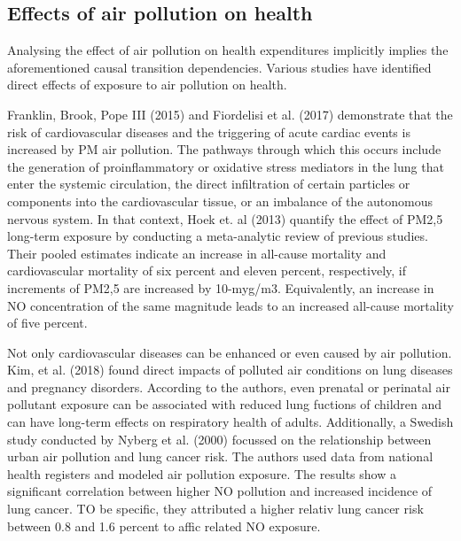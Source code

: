 \documentclass[]{article}
\begin{document}
\subsection{Effects of air pollution on health}

Analysing the effect of air pollution on health expenditures implicitly implies the aforementioned causal transition dependencies. Various studies have identified direct effects of exposure to air pollution on health. %

Franklin, Brook, Pope III (2015) and Fiordelisi et al. (2017) demonstrate that the risk of cardiovascular diseases and the triggering of acute cardiac events is increased by PM air pollution. The pathways through which this occurs include the generation of proinflammatory or oxidative stress mediators in the lung that enter the systemic circulation, the direct infiltration of certain particles or components into the cardiovascular tissue, or an imbalance of the autonomous nervous system. In that context, Hoek et. al (2013) quantify the effect of PM2,5 long-term exposure by conducting a meta-analytic review of previous studies. Their pooled estimates indicate an increase in all-cause mortality and cardiovascular mortality of six percent and eleven percent, respectively, if increments of PM2,5 are increased by 10-myg/m3. Equivalently, an increase in NO concentration of the same magnitude leads to an increased all-cause mortality of five percent. %

Not only cardiovascular diseases can be enhanced or even caused by air pollution. Kim, et al. (2018) found direct impacts of polluted air conditions on lung diseases and pregnancy disorders. According to the authors, even prenatal or perinatal air pollutant exposure can be associated with reduced lung fuctions of children and can have long-term effects on respiratory health of adults. Additionally, a Swedish study conducted by Nyberg et al. (2000) focussed on the relationship between urban air pollution and lung cancer risk. The authors used data from national health registers and modeled air pollution exposure. The results show a significant correlation between higher NO pollution and increased incidence of lung cancer. TO be specific, they attributed a higher relativ lung cancer risk between 0.8 and 1.6 percent to affic related NO exposure. 
\end{document}
